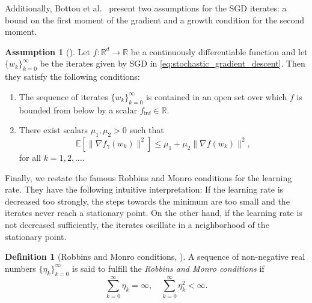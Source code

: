 \documentclass[12pt]{article}
\theoremstyle{definition}
\newtheorem{definition}[definition]{Definition}
\newtheorem{assumption}[assumption]{Assumption}
\numberwithin{equation}{section}
\newcommand{\R}{\mathbb{R}}
\newcommand{\ev}[1]{\mathbb{E}\left[{#1}\right]}
\newcommand{\norm}[1]{\lVert{#1}\rVert_2}
\begin{document}
 Additionally, Bottou et al.\ \cite{bottouOptimizationMethodsLargeScale2018} present two assumptions for the SGD iterates: a bound on the first moment of the gradient and a growth condition for the second moment.
\begin{assumption}[]
  \label{as:sgd_convergence}
  Let $f : \R^d \rightarrow \R$ be a continuously differentiable function and let $\{w_k\}_{k=0}^\infty$ be the iterates given by SGD in \eqref{eq:stochastic_gradient_descent}. Then they satisfy the following conditions:
  \begin{enumerate}[label=(\roman*)]
    \item The sequence of iterates $\{w_k\}_{k=0}^\infty$ is contained in an open set over which $f$ is bounded from below by a scalar $f_{\text{inf}}\in \R$.
    \item There exist scalars $\mu_1, \mu_2 > 0$ such that 
    \begin{equation*}
      \label{eq:variance_linear_growth}
      \ev{\lVert \nabla f_{\gamma}(w_k) \rVert^2} \leq \mu_1 + \mu_2 \lVert \nabla f(w_k) \rVert^2,
    \end{equation*}
    for all $k=1,2,\dots$.
  \end{enumerate}
\end{assumption}

Finally, we restate the famous Robbins and Monro conditions for the learning rate. They have the following intuitive interpretation: If the learning rate is decreased too strongly, the steps towards the minimum are too small and the iterates never reach a stationary point. On the other hand, if the learning rate is not decreased sufficiently, the iterates oscillate in a neighborhood of the stationary point.
\begin{definition}[Robbins and Monro conditions, \cite{robbinsStochasticApproximationMethod1951}]
  A sequence of non-negative real numbers $\{\eta_k\}_{k=0}^\infty$ is said to fulfill the \emph{Robbins and Monro conditions} if
  \begin{equation*}
    \sum_{k=0}^\infty \eta_k = \infty, \quad \sum_{k=0}^\infty \eta_k^2 < \infty.
  \end{equation*}
\end{definition}
\end{document}
